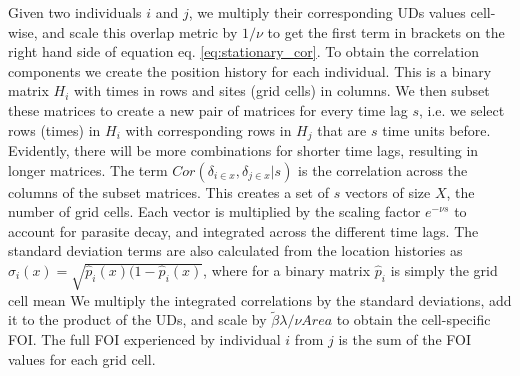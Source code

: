 \documentclass[letterpaper]{article}
\begin{document}
Given two individuals $i$ and $j$, we multiply their corresponding UDs values cell-wise, and scale this overlap metric by $1/\nu$ to get the first term in brackets on the right hand side of equation eq. \ref{eq:stationary_cor}. %
To obtain the correlation components we create the position history for each individual. This is a binary matrix $H_i$ with times in rows and sites (grid cells) in columns. We then subset these matrices to create a new pair of matrices for every time lag $s$, i.e. we select rows (times) in $H_i$ with corresponding rows in $H_j$ that are $s$ time units before. Evidently, there will be more combinations for shorter time lags, resulting in longer matrices. 
The term $Cor(\delta_{i \in x}, \delta_{j \in x} | s)$ is the correlation across the columns of the subset matrices. This creates a set of $s$ vectors of size $X$, the number of grid cells. Each vector is multiplied by the scaling factor $e^{-\nu s}$ to account for parasite decay, and integrated across the different time lags. 
The standard deviation terms are also calculated from the location histories as $\sigma_i(x)=\sqrt{\hat p_i(x)(1-\hat p_i(x)}$, where for a binary matrix $\hat p_i$ is simply the grid cell mean %
We multiply the integrated correlations by the standard deviations, add it to the product of the UDs, and scale by $\tilde\beta\lambda/\nu Area$ to obtain the cell-specific FOI. The full FOI experienced by individual $i$ from $j$ is the sum of the FOI values for each grid cell. 
\end{document}
